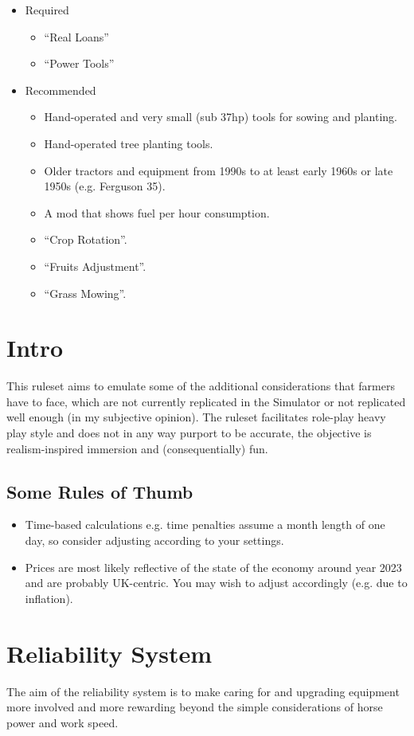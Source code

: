 \documentclass[a4paper,10pt]{article}
\begin{document}
\begin{itemize}
\item Required
  \begin{itemize}
  \item ``Real Loans''
  \item ``Power Tools''
  \end{itemize}
\item Recommended
  \begin{itemize}
  \item Hand-operated and very small (sub 37hp) tools for sowing and planting.
  \item Hand-operated tree planting tools.
  \item Older tractors and equipment from 1990s to at least early 1960s or
    late 1950s (e.g.  Ferguson 35).
  \item A mod that shows fuel per hour consumption.
  \item ``Crop Rotation''.
  \item ``Fruits Adjustment''.
  \item ``Grass Mowing''.
  \end{itemize}
\end{itemize}


\section{Intro}
This ruleset aims to emulate some of the additional considerations that farmers
have to face, which are not currently replicated in the Simulator or not
replicated well enough (in my subjective opinion). The ruleset facilitates
role-play heavy play style and does not in any way purport to be accurate, the
objective is realism-inspired immersion and (consequentially) fun.

\subsection{Some Rules of Thumb}
\begin{itemize}
\item Time-based calculations e.g. time penalties assume a month length of one
  day, so consider adjusting according to your settings.
\item Prices are most likely reflective of the state of the economy around year
  2023 and are probably UK-centric. You may wish to adjust accordingly (e.g. due
  to inflation).
\end{itemize}


\section{Reliability System}
The aim of the reliability system is to make caring for and upgrading equipment
more involved and more rewarding beyond the simple considerations of horse power
and work speed.
\end{document}
